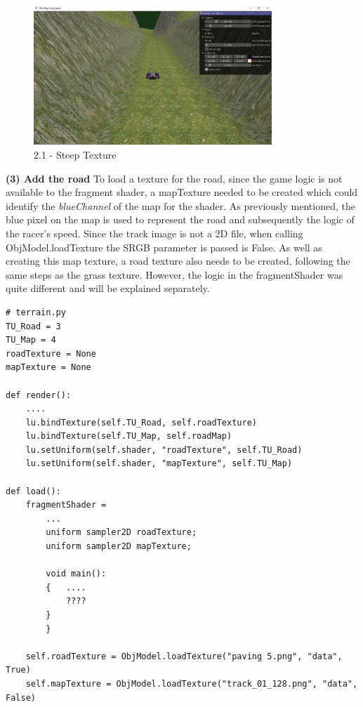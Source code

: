 \documentclass[a4 paper, 12pt]{article}
\begin{document}
    \begin{figure} [H]
        \centering
        \includegraphics[width=0.8\textwidth, frame]
            {./images/mega_racer/2.1_b.PNG}
        \caption{2.1 - Steep Texture}   
    \end{figure}


\textbf{(3) Add the road}
To load a texture for the road, since the game logic is not available to the fragment shader, a mapTexture needed to be created which could identify the \textit{blueChannel} of the map for the shader. As previously mentioned, the blue pixel on the map is used to represent the road and subsequently the logic of the racer's speed. Since the track image is not a 2D file, when calling ObjModel.loadTexture the SRGB parameter is passed is False. As well as creating this map texture, a road texture also needs to be created, following the same steps as the grass texture. However, the logic in the fragmentShader was quite different and will be explained separately.

\begin{lstlisting}
# terrain.py
TU_Road = 3
TU_Map = 4
roadTexture = None
mapTexture = None

def render():
    ....
    lu.bindTexture(self.TU_Road, self.roadTexture)
    lu.bindTexture(self.TU_Map, self.roadMap)
    lu.setUniform(self.shader, "roadTexture", self.TU_Road)
    lu.setUniform(self.shader, "mapTexture", self.TU_Map)

def load():
    fragmentShader = 
        ...
        uniform sampler2D roadTexture;
        uniform sampler2D mapTexture;

        void main():
        {   ....
            ????
        }
        }
    
    self.roadTexture = ObjModel.loadTexture("paving 5.png", "data", True)
    self.mapTexture = ObjModel.loadTexture("track_01_128.png", "data", False)
\end{lstlisting}
\end{document}
